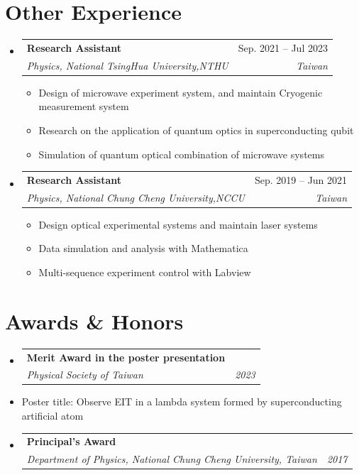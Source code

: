 \documentclass[letterpaper,11pt]{article}
\makeatletter
\newcommand{\resumeItem}[1]{  \item{    {#1 \vspace{-2.5pt}}  }}
\newcommand{\resumeSubheading}[4]{  \vspace{-2pt}\item    \begin{tabular*}{0.97\textwidth}[t]{l@{\extracolsep{\fill}}r}      \textbf{#1} & #2 \\      \textit{\small #3} & \textit{\small #4} \\    \end{tabular*}\vspace{-8pt}}
\newcommand{\resumeSubHeadingListStart}{\begin{itemize}[leftmargin=0.15in, label={}]}
\newcommand{\resumeSubHeadingListEnd}{\end{itemize}}
\newcommand{\resumeItemListStart}{\begin{itemize}}
\newcommand{\resumeItemListEnd}{\end{itemize}\vspace{-2pt}}
\makeatother
\begin{document}
\section{Other Experience}
\resumeSubHeadingListStart
    \resumeSubheading
        {Research Assistant}{Sep. 2021 -- Jul 2023}
        {Physics, National TsingHua University,NTHU}{Taiwan}
        \resumeItemListStart
            \vspace{4pt} %
            \small\resumeItem{Design of microwave experiment system, and maintain Cryogenic measurement system}
            \resumeItem{Research on the application of quantum optics in superconducting qubit}
            \resumeItem{Simulation of quantum optical combination of microwave systems}
        \resumeItemListEnd

    \resumeSubheading
        {Research Assistant}{Sep. 2019 -- Jun 2021}
        {Physics, National Chung Cheng University,NCCU}{Taiwan}
        \resumeItemListStart
            \vspace{4pt} %
            \small\resumeItem{Design optical experimental systems and maintain laser systems}
            \resumeItem{Data simulation and analysis with Mathematica}
            \resumeItem{Multi-sequence experiment control with Labview}
        \resumeItemListEnd
\resumeSubHeadingListEnd

\section{Awards \& Honors}
\resumeSubHeadingListStart
    \resumeSubheading
        {Merit Award in the poster presentation}{}
        {Physical Society of Taiwan}{2023}
        \vspace{2pt} %
        \small\resumeItem{Poster title: Observe EIT in a lambda system formed by superconducting artificial atom}
    \resumeSubheading
        {Principal's Award}{}
        {Department of Physics, National Chung Cheng University, Taiwan}{2017}
\resumeSubHeadingListEnd
\end{document}
